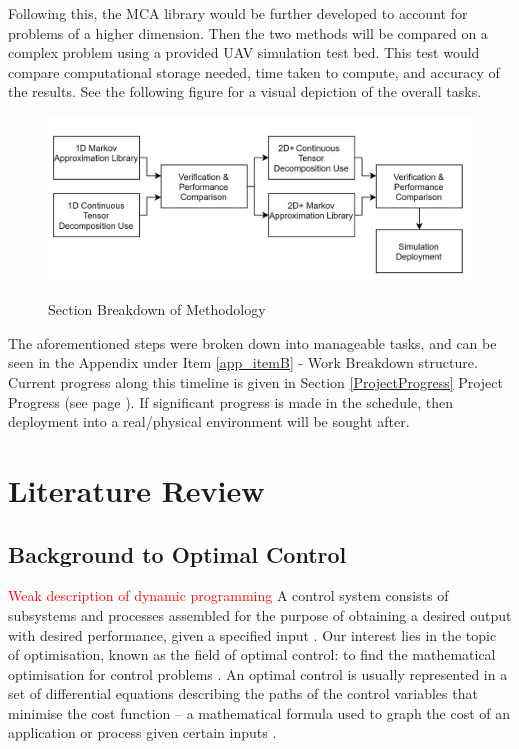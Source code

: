 \documentclass[11pt,draftd]{article}
\begin{document}
\noindent Following this, the MCA library would be further developed to account for problems of a higher dimension. Then the two methods will be compared on a complex problem using a provided UAV simulation test bed. This test would compare computational storage needed, time taken to compute, and accuracy of the results. See the following figure for a visual depiction of the overall tasks.

\begin{figure}[h]
	\centering
	\includegraphics[scale=0.4]{WorkBreakdownMethodologyFigure}
	\label{WorkBreakdownMethodologyFigure}
	\caption{Section Breakdown of Methodology}
\end{figure}

\noindent The aforementioned steps were broken down into manageable tasks, and can be seen in the Appendix under Item \ref{app_itemB} - Work Breakdown structure. Current progress along this timeline is given in Section \ref{ProjectProgress} Project Progress (see page \pageref{ProjectProgress}). If significant progress is made in the schedule, then deployment into a real/physical environment will be sought after.
\newpage
\section{Literature Review} 
\subsection{Background to Optimal Control}
\textcolor{red}{Weak description of dynamic programming}
A control system consists of subsystems and processes assembled for the purpose of obtaining a desired output with desired performance, given a specified input \cite{nise}. Our interest lies in the topic of optimisation, known as the field of optimal control: to find the mathematical optimisation for control problems \cite{ieeeControl}. An optimal control is usually represented in a set of differential equations describing the paths of the control variables that minimise the cost function – a mathematical formula used to graph the cost of an application or process given certain inputs \cite{costfunction}. \\
\end{document}
